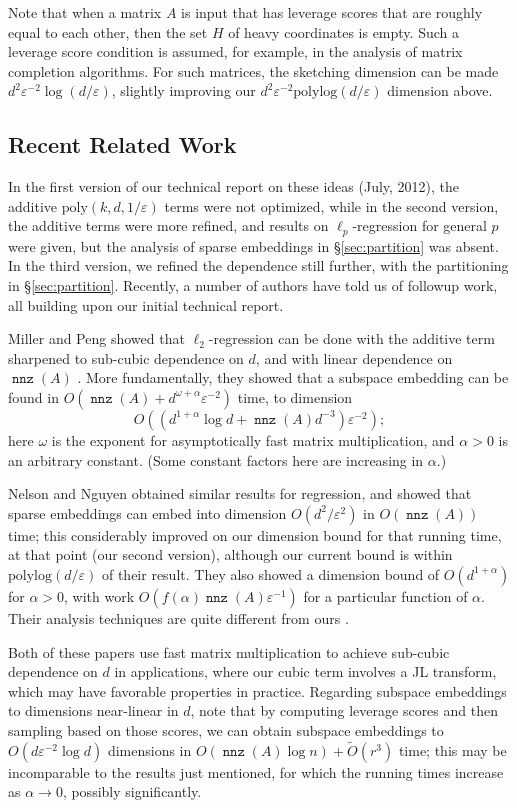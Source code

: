\documentclass{sig-alternate}
\DeclareMathOperator{\nnz}{\mathtt{nnz}}
\newcommand\tO{\tilde{O}}
\newcommand{\poly}{{\mathrm{poly}}}
\newcommand{\eps}{\varepsilon}
\newcommand{\polylog}{{\mathrm{polylog}}}
\begin{document}
Note that when a matrix $A$ is input that has leverage scores that are roughly equal to each other,
then the set $H$ of heavy coordinates is empty. Such a leverage score condition is assumed, for example,
in the analysis of matrix completion algorithms. For such matrices, the sketching dimension can
be made $d^2 \eps^{-2} \log(d/\eps)$, slightly improving our $d^2 \eps^{-2} \polylog(d/\eps)$ dimension above.


\subsection{Recent Related Work}
In the first version of our technical report on these ideas (July, 2012), 
the additive $\poly(k,d,1/\eps)$ terms 
were not optimized, while in the second version, the additive terms were more refined,
and results on $\ell_p$-regression for general $p$ were given,
but the analysis of sparse embeddings in \S\ref{sec:partition} was absent.
In the third version, we refined the dependence still further, with the
partitioning in \S\ref{sec:partition}.
Recently, a number of authors have told us of
followup work, all building upon our initial technical report. 

Miller and Peng showed that $\ell_2$-regression can be done
with the additive term sharpened to sub-cubic dependence
on $d$, and with linear dependence on $\nnz(A)$ \cite{MP}.
More fundamentally, they showed that a subspace embedding
can be found in $O(\nnz(A) + d^{\omega + \alpha}\eps^{-2})$ time, to
dimension
\[
O((d^{1+\alpha}\log d + \nnz(A)d^{-3})\eps^{-2});
\]
here $\omega$ is the exponent for asymptotically fast matrix multiplication,
and $\alpha>0$ is an arbitrary constant. (Some constant factors here are increasing
in $\alpha$.)

Nelson and Nguyen obtained similar results for regression, and
showed that sparse embeddings can embed into dimension $O(d^2/\eps^2)$
in $O(\nnz(A))$ time; this considerably improved on our dimension bound for that running time,
at that point (our second version),
although our current bound is within $\polylog(d/\eps)$ of their result. They also showed a
dimension bound of
$O(d^{1+\alpha})$
for $\alpha>0$, with work $O(f(\alpha)\nnz(A)\eps^{-1})$ for a particular
function of $\alpha$. Their analysis techniques are quite different from ours \cite{NN}.

Both of these papers use fast matrix multiplication to achieve
sub-cubic dependence on $d$ in applications, where our cubic term involves a JL transform,
which may have favorable properties in practice. Regarding subspace embeddings
to dimensions near-linear in $d$, note that by computing leverage scores
and then sampling based on those scores, we can obtain subspace
embeddings to $O(d\eps^{-2}\log d)$ dimensions in $O(\nnz(A)\log n) + \tO(r^3)$
time; this may be incomparable to the results just mentioned, for which the running 
times increase as $\alpha\rightarrow 0$, possibly significantly.
\end{document}
